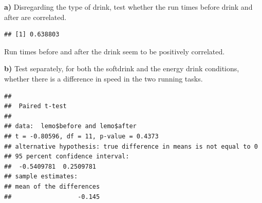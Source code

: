 \documentclass[
]{article}
\newenvironment{Shaded}{\begin{snugshade}}{\end{snugshade}}
\newcommand{\AttributeTok}[1]{\textcolor[rgb]{0.77,0.63,0.00}{#1}}
\newcommand{\CommentTok}[1]{\textcolor[rgb]{0.56,0.35,0.01}{\textit{#1}}}
\newcommand{\ConstantTok}[1]{\textcolor[rgb]{0.00,0.00,0.00}{#1}}
\newcommand{\FunctionTok}[1]{\textcolor[rgb]{0.00,0.00,0.00}{#1}}
\newcommand{\NormalTok}[1]{#1}
\newcommand{\OtherTok}[1]{\textcolor[rgb]{0.56,0.35,0.01}{#1}}
\newcommand{\SpecialCharTok}[1]{\textcolor[rgb]{0.00,0.00,0.00}{#1}}
\newcommand{\StringTok}[1]{\textcolor[rgb]{0.31,0.60,0.02}{#1}}
\begin{document}
\textbf{a)} Disregarding the type of drink, test whether the run times
before drink and after are correlated.

\begin{Shaded}
\end{Shaded}

\begin{verbatim}
## [1] 0.638803
\end{verbatim}

Run times before and after the drink seem to be positively correlated.

\textbf{b)} Test separately, for both the softdrink and the energy drink
conditions, whether there is a difference in speed in the two running
tasks.

\begin{Shaded}
\end{Shaded}

\begin{verbatim}
## 
##  Paired t-test
## 
## data:  lemo$before and lemo$after
## t = -0.80596, df = 11, p-value = 0.4373
## alternative hypothesis: true difference in means is not equal to 0
## 95 percent confidence interval:
##  -0.5409781  0.2509781
## sample estimates:
## mean of the differences 
##                  -0.145
\end{verbatim}
\end{document}

